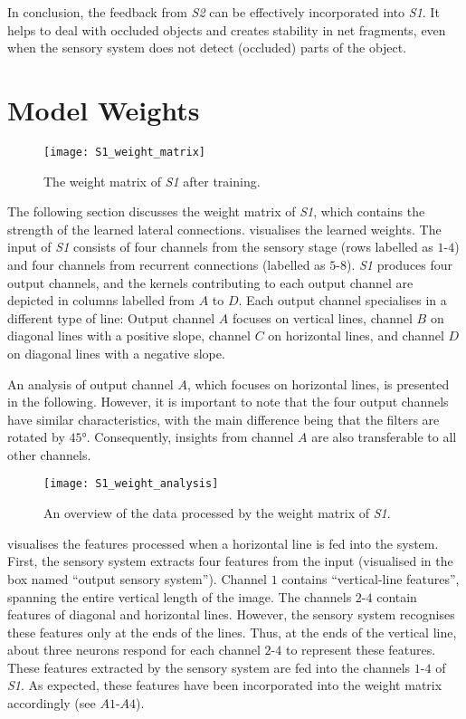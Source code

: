 In conclusion, the feedback from \emph{S2} can be effectively incorporated into \emph{S1}.
It helps to deal with occluded objects and creates stability in net fragments, even when the sensory system does not detect (occluded) parts of the object.



\section{Model Weights}
%
\begin{figure}[h]
    \centering
    \texttt{[image: S1\_weight\_matrix]}
    \caption[Weight matrix of \emph{S1} after training]{The weight matrix of \emph{S1} after training.}
\end{figure}
%
The following section discusses the weight matrix of \emph{S1}, which contains the strength of the learned lateral connections.
 visualises the learned weights. 
The input of \emph{S1} consists of four channels from the sensory stage (rows labelled as $1$-$4$) and four channels from recurrent connections (labelled as $5$-$8$).
\emph{S1} produces four output channels, and the kernels contributing to each output channel are depicted in columns labelled from $A$ to $D$.
Each output channel specialises in a different type of line: Output channel $A$ focuses on vertical lines, channel $B$ on diagonal lines with a positive slope, channel $C$ on horizontal lines, and channel $D$ on diagonal lines with a negative slope.

An analysis of output channel $A$, which focuses on horizontal lines, is presented in the following.
However, it is important to note that the four output channels have similar characteristics, with the main difference being that the filters are rotated by $45°$. Consequently, insights from channel $A$ are also transferable to all other channels.

\begin{figure}[h]
    \centering
    \texttt{[image: S1\_weight\_analysis]}
    \caption[Analysis of the data processed by the weight matrix \emph{S1}]{An overview of the data processed by the weight matrix of \emph{S1}.}
\end{figure}
%
 visualises the features processed when a horizontal line is fed into the system.
First, the sensory system extracts four features from the input (visualised in the box named ``output sensory system'').
Channel $1$ contains ``vertical-line features'', spanning the entire vertical length of the image. 
The channels $2$-$4$ contain features of diagonal and horizontal lines. However, the sensory system recognises these features only at the ends of the lines.
Thus, at the ends of the vertical line, about three neurons respond for each channel $2$-$4$ to represent these features.
These features extracted by the sensory system are fed into the channels $1$-$4$ of \emph{S1}.
As expected, these features have been incorporated into the weight matrix accordingly (see $A1$-$A4$).

